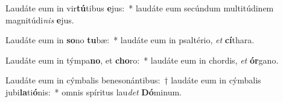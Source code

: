 \item Laudáte eum in vir\textbf{tú}tibus \textbf{e}jus:~* laudáte eum secúndum multitúdinem magnitúdi\textit{nis} \textbf{e}jus.
\item Laudáte eum in \textbf{so}no \textbf{tu}bæ:~* laudáte eum in psaltério, \textit{et} \textbf{cí}thara.
\item Laudáte eum in týmpa\textbf{no}, et \textbf{cho}ro:~* laudáte eum in chordis, \textit{et} \textbf{ór}gano.
\item Laudáte eum in cýmbalis benesonántibus:~† laudáte eum in cýmbalis jubi\textbf{la}ti\textbf{ó}nis:~* omnis spíritus lau\textit{det} \textbf{Dó}minum.
